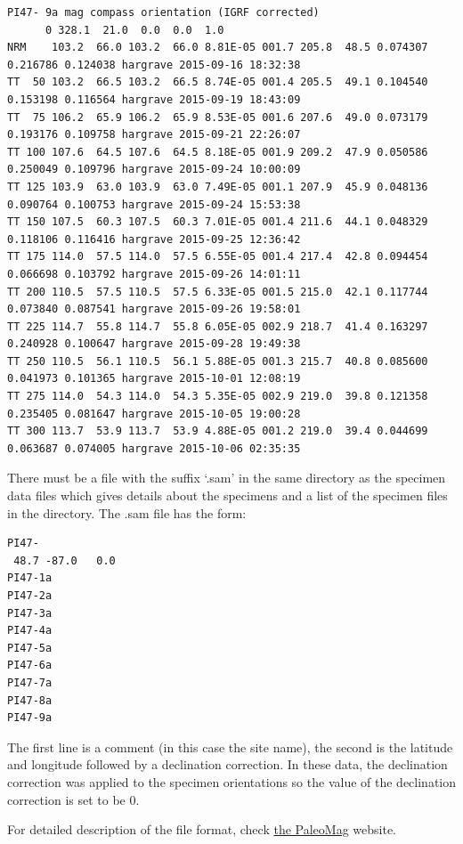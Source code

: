 \documentclass[11pt]{book}
\begin{document}
{{{{\begin{verbatim}
PI47- 9a mag compass orientation (IGRF corrected)
      0 328.1  21.0  0.0  0.0  1.0
NRM    103.2  66.0 103.2  66.0 8.81E-05 001.7 205.8  48.5 0.074307 0.216786 0.124038 hargrave 2015-09-16 18:32:38
TT  50 103.2  66.5 103.2  66.5 8.74E-05 001.4 205.5  49.1 0.104540 0.153198 0.116564 hargrave 2015-09-19 18:43:09
TT  75 106.2  65.9 106.2  65.9 8.53E-05 001.6 207.6  49.0 0.073179 0.193176 0.109758 hargrave 2015-09-21 22:26:07
TT 100 107.6  64.5 107.6  64.5 8.18E-05 001.9 209.2  47.9 0.050586 0.250049 0.109796 hargrave 2015-09-24 10:00:09
TT 125 103.9  63.0 103.9  63.0 7.49E-05 001.1 207.9  45.9 0.048136 0.090764 0.100753 hargrave 2015-09-24 15:53:38
TT 150 107.5  60.3 107.5  60.3 7.01E-05 001.4 211.6  44.1 0.048329 0.118106 0.116416 hargrave 2015-09-25 12:36:42
TT 175 114.0  57.5 114.0  57.5 6.55E-05 001.4 217.4  42.8 0.094454 0.066698 0.103792 hargrave 2015-09-26 14:01:11
TT 200 110.5  57.5 110.5  57.5 6.33E-05 001.5 215.0  42.1 0.117744 0.073840 0.087541 hargrave 2015-09-26 19:58:01
TT 225 114.7  55.8 114.7  55.8 6.05E-05 002.9 218.7  41.4 0.163297 0.240928 0.100647 hargrave 2015-09-28 19:49:38
TT 250 110.5  56.1 110.5  56.1 5.88E-05 001.3 215.7  40.8 0.085600 0.041973 0.101365 hargrave 2015-10-01 12:08:19
TT 275 114.0  54.3 114.0  54.3 5.35E-05 002.9 219.0  39.8 0.121358 0.235405 0.081647 hargrave 2015-10-05 19:00:28
TT 300 113.7  53.9 113.7  53.9 4.88E-05 001.2 219.0  39.4 0.044699 0.063687 0.074005 hargrave 2015-10-06 02:35:35
\end{verbatim}

There must be a file with the suffix `.sam' in the same directory as the specimen data files which gives details about the specimens and a list of the specimen files in the directory. The .sam file has the form:

\begin{verbatim}
PI47-
 48.7 -87.0   0.0
PI47-1a
PI47-2a
PI47-3a
PI47-4a
PI47-5a
PI47-6a
PI47-7a
PI47-8a
PI47-9a
\end{verbatim}

The first line is a comment (in this case the site name), the second is the latitude and longitude followed by a declination correction. In these data, the declination correction was applied to the specimen orientations so the value of the declination correction is set to be 0.

For detailed description of the file format, check \href{http://cires.colorado.edu/people/jones.craig/PMag3.html}{the PaleoMag} website.

}}}}
\end{document}
